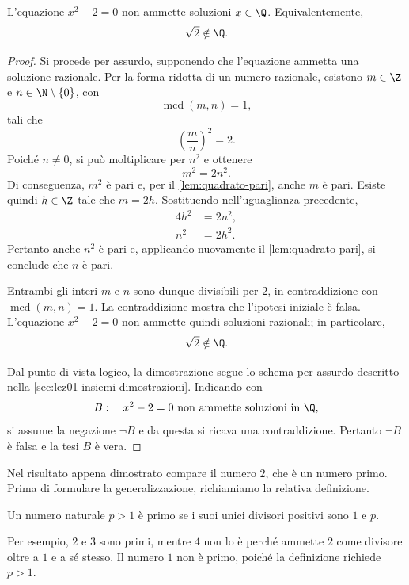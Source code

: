 \begin{theorem}
\label{thm:irrazionalita-radice-due}
L'equazione \(x^2-2=0\) non ammette soluzioni \(x\in\Q\). Equivalentemente,
\[
  \sqrt{2}\notin\Q.
\]
\end{theorem}

\begin{proof}
Si procede per assurdo, supponendo che l'equazione ammetta una soluzione
razionale. Per la forma ridotta di un numero razionale, esistono
\(m\in\Z\) e \(n\in\N\setminus\{0\}\), con
\[
  \operatorname{mcd}(m,n)=1,
\]
tali che
\[
  \left(\frac{m}{n}\right)^2=2.
\]
Poiché \(n\neq0\), si può moltiplicare per \(n^2\) e ottenere
\[
  m^2=2n^2.
\]
Di conseguenza, \(m^2\) è pari e, per il \cref{lem:quadrato-pari}, anche
\(m\) è pari. Esiste quindi \(h\in\Z\) tale che \(m=2h\). Sostituendo
nell'uguaglianza precedente,
\begin{align*}
  4h^2&=2n^2,\\
  n^2&=2h^2.
\end{align*}
Pertanto anche \(n^2\) è pari e, applicando nuovamente il
\cref{lem:quadrato-pari}, si conclude che \(n\) è pari.

Entrambi gli interi \(m\) e \(n\) sono dunque divisibili per \(2\), in
contraddizione con \(\operatorname{mcd}(m,n)=1\). La contraddizione mostra
che l'ipotesi iniziale è falsa. L'equazione \(x^2-2=0\) non ammette
quindi soluzioni razionali; in particolare,
\[
  \sqrt{2}\notin\Q.
\]

Dal punto di vista logico, la dimostrazione segue lo schema per assurdo
descritto nella \cref{sec:lez01-insiemi-dimostrazioni}. Indicando con
\[
  B:\quad x^2-2=0 \text{ non ammette soluzioni in }\Q,
\]
si assume la negazione \(\neg B\) e da questa si ricava una contraddizione.
Pertanto \(\neg B\) è falsa e la tesi \(B\) è vera.
\end{proof}

Nel risultato appena dimostrato compare il numero \(2\), che è un numero
primo. Prima di formulare la generalizzazione, richiamiamo la relativa
definizione.

\begin{definition}
\label{def:numero-primo}
Un numero naturale \(p>1\) è primo se i suoi unici divisori positivi sono
\(1\) e \(p\).
\end{definition}

Per esempio, \(2\) e \(3\) sono primi, mentre \(4\) non lo è perché
ammette \(2\) come divisore oltre a \(1\) e a sé stesso. Il numero \(1\)
non è primo, poiché la definizione richiede \(p>1\).

